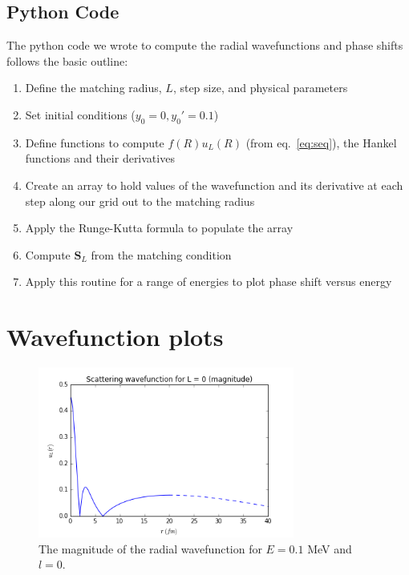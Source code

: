 \documentclass[]{scrartcl}
\begin{document}
\subsection*{Python Code}

The python code we wrote to compute the radial wavefunctions and phase shifts follows the basic outline:

\begin{enumerate}
	\item Define the matching radius, $L$, step size, and physical parameters
	\item Set initial conditions ($y_0 = 0, y_0 ' = 0.1$) 
	\item Define functions to compute $f(R)u_L(R)$ (from eq.~\ref{eq:seq}), the Hankel functions and their derivatives
	\item Create an array to hold values of the wavefunction and its derivative at each step along our grid out to the matching radius
	\item Apply the Runge-Kutta formula to populate the array
	\item Compute $\mathbf{S}_L$ from the matching condition
	\item Apply this routine for a range of energies to plot phase shift versus energy
\end{enumerate}


\section*{Wavefunction plots}

\begin{figure}[h]
\centering
	\includegraphics[width=0.75\textwidth]{figures/E01/magnitude0.png}
	\caption{The magnitude of the radial wavefunction for $E = 0.1$ MeV and $l=0$.}
	\label{fig:e01l0}
\end{figure}
\end{document}
